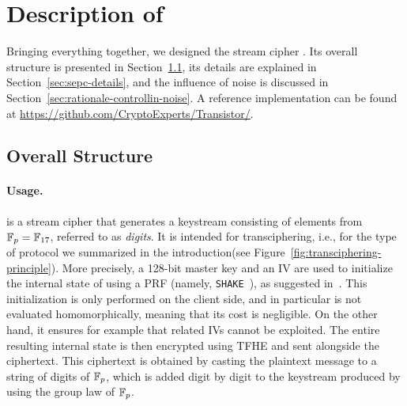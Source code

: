 \section{Description of \coolName}
\label{sec:description}



Bringing everything together, we designed the stream cipher \coolName{}.
Its overall structure is presented in Section~\ref{sec:description-structure}, its details are explained in Section~\ref{sec:sepc-details}, and the influence of noise is discussed in Section~\ref{sec:rationale-controllin-noise}. A reference implementation can be found at
  \url{https://github.com/CryptoExperts/Transistor/}.

\subsection{Overall Structure}
\label{sec:description-structure}


\paragraph{Usage.}
\label{sec:usage}
\coolName{} is a stream cipher that generates a keystream consisting of elements from \( \mathbb{F}_{p} = \mathbb{F}_{17} \), referred to as {\em digits}.  It is intended for transciphering, i.e., for the type of protocol we summarized in the introduction\ifeprint (see Figure~\ref{fig:transciphering-principle})\fi.
More precisely, a 128-bit master key and an IV are used to initialize the internal state of \coolName{} using  a PRF (namely, {\tt SHAKE}~\cite{add:SHA3}), as suggested in~\cite{FSE:BerGil07}. This initialization  is only performed on the client side, and in particular is not evaluated homomorphically, meaning that its cost is negligible. On the other hand, it ensures for example that related IVs cannot be exploited. The entire resulting internal state is then encrypted using TFHE and sent alongside the ciphertext. This ciphertext is obtained by casting the plaintext message to a string of digits of $\mathbb{F}_{p}$, which is added digit by digit to the keystream produced by \coolName{} using the group law of $\mathbb{F}_{p}$.




